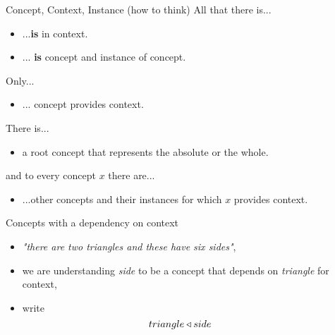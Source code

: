 

\begin{frame}{Concept, Context, Instance (how to think)}
All that there is...
\begin{itemize}
\item ...\textbf{is} in context.
\item ... \textbf{is} concept and instance of concept.
\end{itemize}
Only...
\begin{itemize}
\item ... concept provides context.
\end{itemize}
There is...
\begin{itemize}
\item a root concept that represents the absolute or the whole.
\end{itemize}
and to every concept $x$ there are...
\begin{itemize}
\item ...other concepts and their instances for which $x$ provides context.
\end{itemize}
\iffalse{
By the way...
\begin{itemize}
\item a concept whose context is provided by the absolute can be said to be an absolute concept.  
All of its instances can also be said to be absolute.
\end{itemize}
}\fi
\end{frame}

\begin{frame}{Concepts with a dependency on context}
\begin{center}
\raisebox{-0.5cm}{
\pspicture(0,-0.1)(1.1,1)
\psline(0,0)(0,1)(1,1)(1,0)(0,0)
\psline (0,0)(1,1)
\endpspicture
}
\end{center}
\begin{itemize}
\item \textit{"there are two triangles and these have six sides"}, 
\item  we are understanding \textit{side} to be a concept that 
depends on \textit{triangle} for context,
\item write $$triangle \base side\ \ \ \ \ \ \ $$
\end{itemize}
\end{frame}


